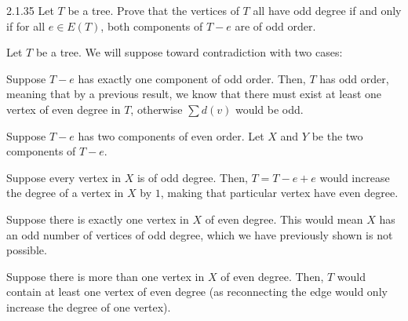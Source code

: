 \documentclass[9pt]{extarticle}
\begin{document}
  \begin{problem}{2.1.35}
    Let $T$ be a tree. Prove that the vertices of $T$ all have odd degree if and only if for all $e\in E(T)$, both components of $T - e$ are of odd order.
    \tcblower
    \begin{description}[font=\normalfont\scshape]
      \item[($\Rightarrow$)] Let $T$ be a tree. We will suppose toward contradiction with two cases:
        \begin{description}[font=\normalfont\scshape]
          \item[Case 1] Suppose $T-e$ has exactly one component of odd order. Then, $T$ has odd order, meaning that by a previous result, we know that there must exist at least one vertex of even degree in $T$, otherwise $\sum d(v)$ would be odd.
          \item[Case 2] Suppose $T-e$ has two components of even order. Let $X$ and $Y$ be the two components of $T-e$.
            \begin{description}[font = \normalfont\scshape]
              \item[Subcase 2.1] Suppose every vertex in $X$ is of odd degree. Then, $T = T-e + e$ would increase the degree of a vertex in $X$ by $1$, making that particular vertex have even degree.
              \item[Subcase 2.2] Suppose there is exactly one vertex in $X$ of even degree. This would mean $X$ has an odd number of vertices of odd degree, which we have previously shown is not possible.
              \item[Subcase 2.3] Suppose there is more than one vertex in $X$ of even degree. Then, $T$ would contain at least one vertex of even degree (as reconnecting the edge would only increase the degree of one vertex).
            \end{description}
        \end{description}
    \end{description}
  \end{problem}
\end{document}
